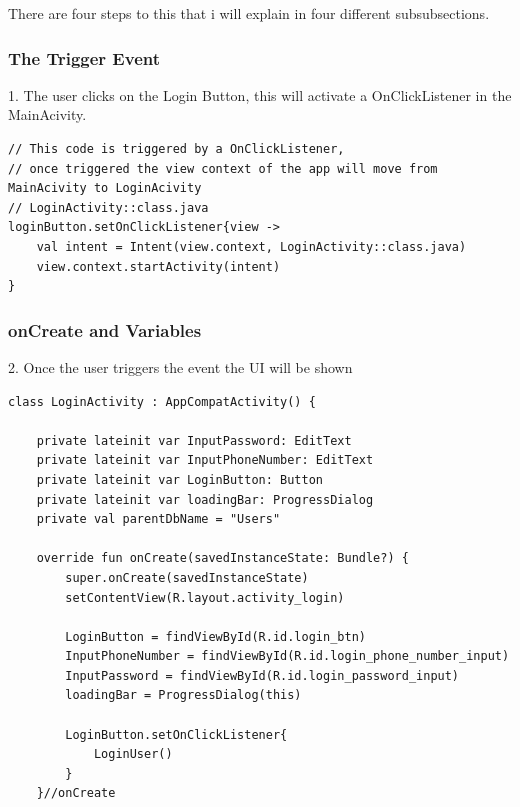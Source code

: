 There are four steps to this that i will explain in four different subsubsections.

\subsubsection{The Trigger Event}
1. The user clicks on the Login Button, this will activate a OnClickListener in the MainAcivity.
\begin{verbatim}
// This code is triggered by a OnClickListener, 
// once triggered the view context of the app will move from MainAcivity to LoginAcivity
// LoginActivity::class.java
loginButton.setOnClickListener{view ->
    val intent = Intent(view.context, LoginActivity::class.java)
    view.context.startActivity(intent)
}
\end{verbatim}

\subsubsection{onCreate and Variables}
2. Once the user triggers the event the UI will be shown

\begin{verbatim}
class LoginActivity : AppCompatActivity() {

    private lateinit var InputPassword: EditText
    private lateinit var InputPhoneNumber: EditText
    private lateinit var LoginButton: Button
    private lateinit var loadingBar: ProgressDialog
    private val parentDbName = "Users"

    override fun onCreate(savedInstanceState: Bundle?) {
        super.onCreate(savedInstanceState)
        setContentView(R.layout.activity_login)

        LoginButton = findViewById(R.id.login_btn)
        InputPhoneNumber = findViewById(R.id.login_phone_number_input)
        InputPassword = findViewById(R.id.login_password_input)
        loadingBar = ProgressDialog(this)
        
        LoginButton.setOnClickListener{
            LoginUser()
        }
    }//onCreate
\end{verbatim}
\newpage
